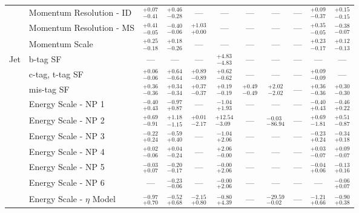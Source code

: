 \begin{tabular}{|cl||ccccccc|c||c|}
\cline{2-11}
&Momentum Resolution - ID &  $^{+0.07}_{-0.41}$  &  $^{+0.46}_{-0.28}$  & --- & --- & --- & --- & --- &  $^{+0.09}_{-0.37}$  &  $^{+0.15}_{-0.15}$ \\ 
\cline{2-11}
&Momentum Resolution - MS &  $^{+0.41}_{-0.05}$  &  $^{-0.40}_{-0.06}$  &  $^{+1.03}_{+0.00}$  & --- & --- & --- & --- &  $^{+0.35}_{-0.05}$  &  $^{-0.38}_{-0.07}$ \\ 
\cline{2-11}
&Momentum Scale &  $^{+0.25}_{-0.18}$  &  $^{+0.18}_{-0.26}$  & --- & --- & --- & --- & --- &  $^{+0.23}_{-0.17}$  &  $^{+0.12}_{-0.13}$ \\ 
\hline
\multirow{22}{*}{Jet}
&b-tag SF & --- & --- & --- &  $^{+4.83}_{-4.83}$  & --- & --- & --- & --- & ---\\ 
\cline{2-11}
&c-tag, t-tag SF &  $^{+0.06}_{-0.06}$  &  $^{+0.64}_{-0.64}$  &  $^{+0.89}_{-0.89}$  &  $^{+0.62}_{-0.62}$  & --- & --- & --- &  $^{+0.09}_{-0.09}$  & ---\\ 
\cline{2-11}
&mis-tag SF &  $^{+0.36}_{-0.36}$  &  $^{+0.34}_{-0.34}$  &  $^{+0.37}_{-0.37}$  &  $^{+0.19}_{-0.19}$  &  $^{+0.49}_{-0.49}$  &  $^{+2.02}_{-2.02}$  & --- &  $^{+0.36}_{-0.36}$  &  $^{+0.30}_{-0.30}$ \\ 
\cline{2-11}
&Energy Scale - NP 1 &  $^{-0.40}_{+0.43}$  &  $^{-0.97}_{+0.87}$  & --- &  $^{-1.04}_{+1.93}$  & --- & --- & --- &  $^{-0.40}_{+0.43}$  &  $^{-0.46}_{+0.22}$ \\ 
\cline{2-11}
&Energy Scale - NP 2 &  $^{+0.69}_{-0.91}$  &  $^{+1.18}_{-1.15}$  &  $^{+0.01}_{-2.17}$  &  $^{+12.54}_{-3.09}$  & --- &  $^{-0.03}_{-86.94}$  & --- &  $^{+0.69}_{-1.81}$  &  $^{+0.51}_{-0.87}$ \\ 
\cline{2-11}
&Energy Scale - NP 3 &  $^{-0.22}_{+0.24}$  &  $^{-0.59}_{+0.40}$  & --- &  $^{-1.04}_{+2.06}$  & --- & --- & --- &  $^{-0.23}_{+0.24}$  &  $^{-0.34}_{+0.18}$ \\ 
\cline{2-11}
&Energy Scale - NP 4 &  $^{+0.02}_{-0.06}$  &  $^{+0.04}_{-0.24}$  & --- &  $^{+2.06}_{-0.00}$  & --- & --- & --- &  $^{+0.03}_{-0.07}$  &  $^{+0.09}_{-0.07}$ \\ 
\cline{2-11}
&Energy Scale - NP 5 &  $^{-0.03}_{+0.07}$  &  $^{-0.20}_{-0.17}$  & --- &  $^{-0.00}_{+2.06}$  & --- & --- & --- &  $^{-0.04}_{+0.06}$  &  $^{-0.13}_{+0.16}$ \\ 
\cline{2-11}
&Energy Scale - NP 6 & --- &  $^{-0.23}_{-0.06}$  & --- &  $^{-0.00}_{+2.06}$  & --- & --- & --- & --- &  $^{-0.06}_{+0.07}$ \\ 
\cline{2-11}
&Energy Scale - $\eta$ Model &  $^{-0.97}_{+0.70}$  &  $^{-0.52}_{+0.68}$  &  $^{-2.15}_{+0.80}$  &  $^{-0.80}_{+4.39}$  & --- &  $^{-29.59}_{-0.02}$  & --- &  $^{-1.21}_{+0.66}$  &  $^{-0.90}_{+0.38}$ \\ 

\end{tabular}
